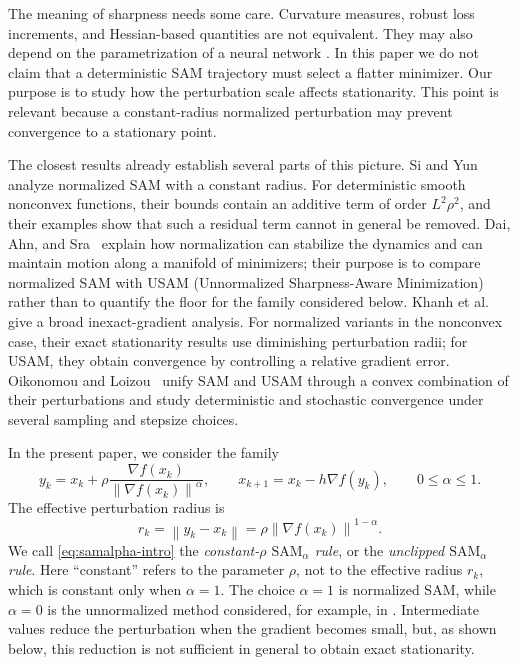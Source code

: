 \documentclass[11pt]{article}
\theoremstyle{remark}
\newcommand{\norm}[1]{\left\lVert #1\right\rVert}
\newcommand{\SAMa}{\mathrm{SAM}_{\alpha}}
\begin{document}
The meaning of sharpness needs some care.  Curvature measures, robust loss
increments, and Hessian-based quantities are not equivalent.  They may also
depend on the parametrization of a neural network
\cite{Dinh2017,Tahmasebi2024}.  In this paper we do not claim that a
deterministic SAM trajectory must select a flatter minimizer.  Our purpose is
to study how the perturbation scale affects stationarity.
This point is relevant because a constant-radius normalized perturbation may
prevent convergence to a stationary point.

The closest results already establish several parts of this picture.
Si and Yun~\cite{Si2023} analyze normalized SAM with a constant radius.
For deterministic smooth nonconvex functions, their bounds contain an
additive term of order $L^2\rho^2$, and their examples show that such a
residual term cannot in general be removed.  Dai, Ahn, and
Sra~\cite{Dai2023} explain how normalization can stabilize the dynamics and
can maintain motion along a manifold of minimizers; their purpose is to
compare normalized SAM with USAM {(Unnormalized Sharpness-Aware Minimization)} rather than to quantify the floor for the
family considered below.  Khanh et al.~\cite{Khanh2024} give a broad
inexact-gradient analysis.  For normalized variants in the nonconvex case,
their exact stationarity results use diminishing perturbation radii; for
USAM, they obtain convergence by controlling a relative gradient error.
Oikonomou and Loizou~\cite{Oikonomou2025} unify SAM and USAM through a
convex combination of their perturbations and study deterministic and
stochastic convergence under several sampling and stepsize choices. 

 In the present paper,  we consider the family
\begin{equation}\label{eq:samalpha-intro}
  y_k=x_k+\rho
  \frac{\nabla f(x_k)}{\norm{\nabla f(x_k)}^\alpha},
  \qquad
  x_{k+1}=x_k-h\nabla f(y_k),
  \qquad 0\leq\alpha\leq1.
\end{equation}
The effective perturbation radius is
\begin{equation}\label{eq:radius-intro}
  r_k=\norm{y_k-x_k}
      =\rho\norm{\nabla f(x_k)}^{1-\alpha}.
\end{equation}
We call \eqref{eq:samalpha-intro} the \emph{constant-$\rho$
$\SAMa$ rule}, or the \emph{unclipped $\SAMa$ rule}.  Here
``constant'' refers to the parameter $\rho$, not to the effective radius
$r_k$, which is constant only when $\alpha=1$.
The choice $\alpha=1$ is normalized SAM, while $\alpha=0$ is the
unnormalized method considered, for example, in
\cite{Andriushchenko2022,Khanh2024}.  Intermediate values reduce the
perturbation when the gradient becomes small, but, as shown below, this
reduction is not sufficient in general to obtain exact stationarity.
\end{document}

